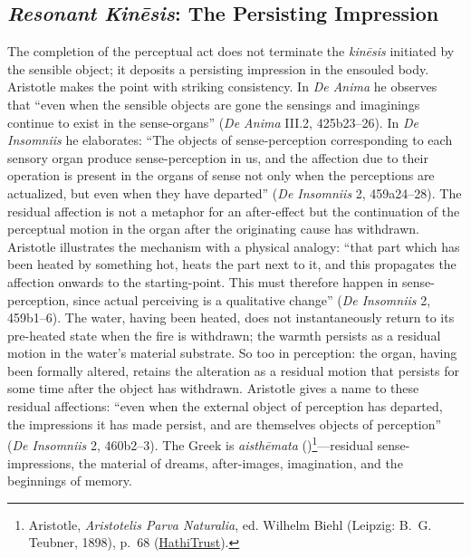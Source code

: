 \subsection{\textit{Resonant Kinēsis}: The Persisting Impression}

The completion of the perceptual act does not terminate the \textit{kinēsis} initiated by the sensible object; it deposits a persisting impression in the ensouled body. Aristotle makes the point with striking consistency. In \textit{De Anima} he observes that ``even when the sensible objects are gone the sensings and imaginings continue to exist in the sense-organs'' (\textit{De Anima} III.2, 425b23--26). In \textit{De Insomniis} he elaborates: ``The objects of sense-perception corresponding to each sensory organ produce sense-perception in us, and the affection due to their operation is present in the organs of sense not only when the perceptions are actualized, but even when they have departed'' (\textit{De Insomniis} 2, 459a24--28). The residual affection is not a metaphor for an after-effect but the continuation of the perceptual motion in the organ after the originating cause has withdrawn. Aristotle illustrates the mechanism with a physical analogy: ``that part which has been heated by something hot, heats the part next to it, and this propagates the affection onwards to the starting-point. This must therefore happen in sense-perception, since actual perceiving is a qualitative change'' (\textit{De Insomniis} 2, 459b1--6). The water, having been heated, does not instantaneously return to its pre-heated state when the fire is withdrawn; the warmth persists as a residual motion in the water's material substrate. So too in perception: the organ, having been formally altered, retains the alteration as a residual motion that persists for some time after the object has withdrawn. Aristotle gives a name to these residual affections: ``even when the external object of perception has departed, the impressions it has made persist, and are themselves objects of perception'' (\textit{De Insomniis} 2, 460b2--3). The Greek is \textit{aisthēmata} ()\footnote{Aristotle, \textit{Aristotelis Parva Naturalia}, ed. Wilhelm Biehl (Leipzig: B.~G. Teubner, 1898), p.~68 (\href{https://catalog.hathitrust.org/Record/001227560/Home}{HathiTrust}).}---residual sense-impressions, the material of dreams, after-images, imagination, and the beginnings of memory.


